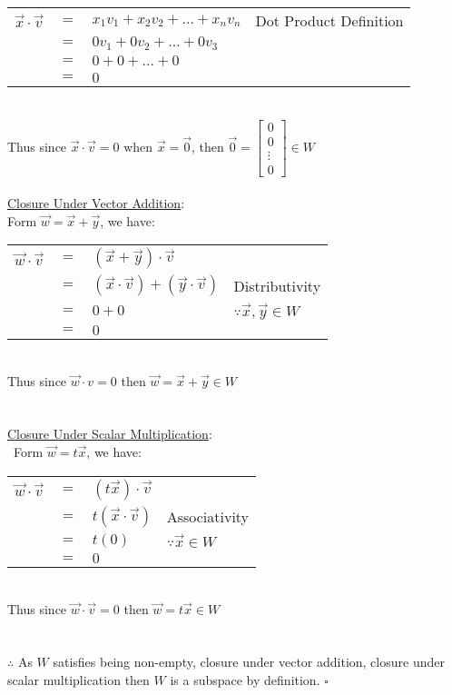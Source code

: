 \documentclass{article}
\begin{document}
\begin{table}[htp]
    \begin{tabular}{ccll}
        $\vec{x}\cdot\vec{v}$ & $=$ & $x_1v_1+x_2v_2+\dots+x_nv_n$   & Dot Product Definition\\
         & $=$ & $0v_1+0v_2+\dots+0v_3$&\\
         & $=$ & $0+0+\dots+0$&\\
         & $=$ & $0$&\\
    \end{tabular}
\end{table} \\
Thus since $\vec{x}\cdot\vec{v}=0$ when $\vec{x}=\vec{0}$, then $\vec{0}=\begin{bmatrix}
    0\\0\\\vdots\\0
\end{bmatrix}\in W$\\\\
\underline{Closure Under Vector Addition}:\\
Form $\vec{w}=\vec{x}+\vec{y}$, we have:\\

\begin{table}[htp]
    \centering
    \begin{tabular}{ccll}
        $\vec{w}\cdot\vec{v}$ & $=$ & $(\vec{x}+\vec{y})\cdot\vec{v}$ & \\
         & $=$ & $(\vec{x}\cdot\vec{v})+(\vec{y}\cdot\vec{v})$ & Distributivity\\
         & $=$ & $0+0$ & $\because \vec{x},\vec{y}\in W$\\
         & $=$ & $0$ &
    \end{tabular}
\end{table} \\
Thus since $\vec{w}\cdot{v}=0$ then $\vec{w}=\vec{x}+\vec{y}\in W$ \\
\\\\
\underline{Closure Under Scalar Multiplication}:\\\
Form $\vec{w}=t\vec{x}$, we have:

\begin{table}[htp]
    \centering
    \begin{tabular}{ccll}
        $\vec{w}\cdot\vec{v}$ & $=$ & $(t\vec{x})\cdot\vec{v}$ & \\
         & $=$ & $t(\vec{x}\cdot\vec{v})$ & Associativity\\
         & $=$ & $t(0)$ & $\because \vec{x}\in W$\\
         & $=$ & $0$ & \\
    \end{tabular}
\end{table} \\
Thus since $\vec{w}\cdot\vec{v}=0$ then $\vec{w}=t\vec{x}\in W$\\\\\\
$\therefore$ As $W$ satisfies being non-empty, closure under vector addition, closure under scalar multiplication then $W$ is a subspace by definition. \;$\square$
\end{document}
